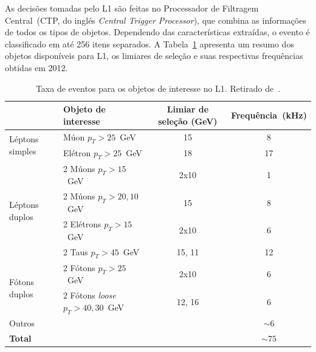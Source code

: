 As decisões tomadas pelo L1 são feitas no Processador de  Filtragem
Central~(CTP, do inglés \emph{Central Trigger Processor}), que combina as
informações de todos os tipos de objetos.  Dependendo das características
extraídas, o evento é classificado em até 256 itens separados. A
Tabela~\ref{table:l1objects} apresenta um resumo dos objetos disponíveis para
L1, os limiares de seleção e suas respectivas frequências obtidas em 2012.

\begin{table}[htbp!]\footnotesize
  \centering
  \tabcolsep=0.08cm
  \begin{tabular}{ l  m{5cm} c c }
      \toprule
                                          & Objeto de interesse & Limiar de seleção (GeV) & Frequência~(kHz) \\
      \midrule
      \multirow{2}{*}{Léptons simples}    & Múon $p_T > 25$~GeV        &      15             & 8        \\
                                          & Elétron $p_T > 25$~GeV     &      18             & 17       \\
      \midrule
      \multirow{4}{*}{Léptons duplos}     & 2 Múons $p_T > 15$~GeV     &      2x10           & 1        \\
                                          & 2 Múons $p_T > 20,10$~GeV  &      15             & 8        \\
                                          & 2 Elétrons $p_T > 15$~GeV  &      2x10           & 6        \\
                                          & 2 Taus $p_T > 45$~GeV      &      15, 11         & 12       \\
      \midrule
      \multirow{2}{*}{Fótons  duplos}     & 2 Fótons $p_T > 25$~GeV    &   2x10              & 6        \\
                                          & 2 Fótons \emph{loose} $p_T > 40,30$~GeV & 12, 16 & 6        \\
      \midrule
      Outros                              &                            &                     & $\sim 6$ \\
      \midrule
      {\bf Total}                         &                            &                     & $\sim 75$ \\
      \bottomrule
  \end{tabular}
  \caption[Taxa de eventos para os objetos de interesse no L1.]{Taxa de eventos
  para os objetos de interesse no L1. Retirado de~\cite{PETERSEN}.}
  \label{table:l1objects}
\end{table}

